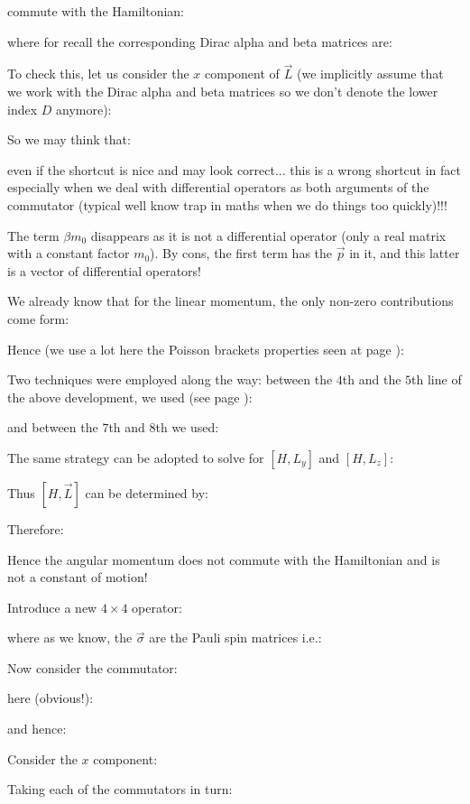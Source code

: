 	commute with the Hamiltonian:
	
	where for recall the corresponding Dirac alpha and beta matrices are:
	
	To check this, let us consider the $x$ component of $\vec{L}$ (we implicitly assume that we work with the Dirac alpha and beta matrices so we don't denote the lower index $D$ anymore):
	
	So we may think that:
	
	even if the shortcut is nice and may look correct... this is a wrong shortcut in fact especially when we deal with differential operators as both arguments of the commutator (typical well know trap in maths when we do things too quickly)!!!
	\begin{tcolorbox}[title=Remark,colframe=black,arc=10pt]
	The term $\beta m_0$ disappears as it is not a differential operator (only a real matrix with a constant factor $m_0$). By cons, the first term has the $\vec{p}$ in it, and this latter is a vector of differential operators!
	\end{tcolorbox}
	
	We already know that for the linear momentum, the only non-zero contributions come form:
	
	Hence (we use a lot here the Poisson brackets properties seen at page \pageref{poisson bracket}):
	
	Two techniques were employed along the way: between the $4$th and the $5$th line of the above development, we used (see page \pageref{poisson bracket}):
	
	and between the $7$th and $8$th we used:
	
	The same strategy can be adopted to solve for $[H,L_y]$ and $[H,L_z]$:
	
	Thus $[H,\vec{L}]$ can be determined by:
	
	Therefore:
	
	Hence the angular momentum does not commute with the Hamiltonian and is not a constant of motion!
	
	Introduce a new $4\times 4$ operator:
	
	where as we know, the $\vec{\sigma}$ are the Pauli spin matrices i.e.:
	
	Now consider the commutator:
	
	here (obvious!):
	
	and hence:
	
	Consider the $x$ component:
	
	Taking each of the commutators in turn:
	
